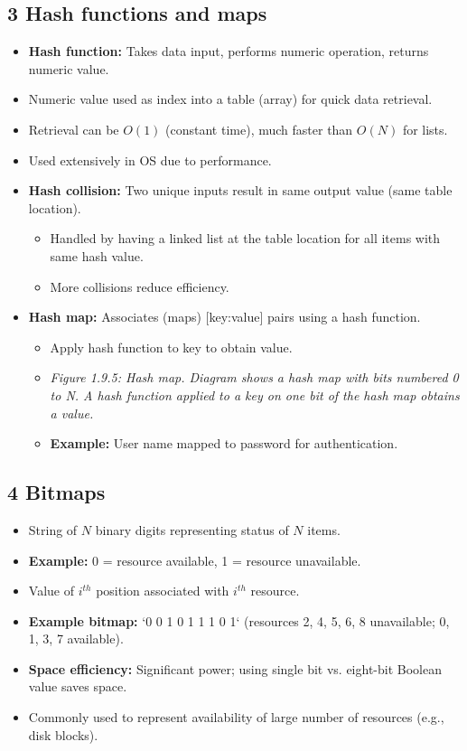 \documentclass{article}
\begin{document}
\subsection*{3 Hash functions and maps}
\begin{itemize}
    \item \textbf{Hash function:} Takes data input, performs numeric operation, returns numeric value.
    \item Numeric value used as index into a table (array) for quick data retrieval.
    \item Retrieval can be $O(1)$ (constant time), much faster than $O(N)$ for lists.
    \item Used extensively in OS due to performance.
    \item \textbf{Hash collision:} Two unique inputs result in same output value (same table location).
    \begin{itemize}
        \item Handled by having a linked list at the table location for all items with same hash value.
        \item More collisions reduce efficiency.
    \end{itemize}
    \item \textbf{Hash map:} Associates (maps) [key:value] pairs using a hash function.
    \begin{itemize}
        \item Apply hash function to key to obtain value.
        \item \textit{Figure 1.9.5: Hash map. Diagram shows a hash map with bits numbered 0 to N. A hash function applied to a key on one bit of the hash map obtains a value.}
        \item \textbf{Example:} User name mapped to password for authentication.
    \end{itemize}
\end{itemize}

\subsection*{4 Bitmaps}
\begin{itemize}
    \item String of $N$ binary digits representing status of $N$ items.
    \item \textbf{Example:} 0 = resource available, 1 = resource unavailable.
    \item Value of $i^{th}$ position associated with $i^{th}$ resource.
    \item \textbf{Example bitmap:} `0 0 1 0 1 1 1 0 1` (resources 2, 4, 5, 6, 8 unavailable; 0, 1, 3, 7 available).
    \item \textbf{Space efficiency:} Significant power; using single bit vs. eight-bit Boolean value saves space.
    \item Commonly used to represent availability of large number of resources (e.g., disk blocks).
\end{itemize}
\end{document}
